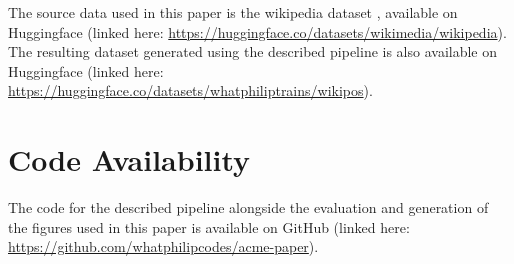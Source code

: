 The source data used in this paper is the wikipedia dataset \cite{WikimediaWikipediaDatasets2025}, available on Huggingface (linked here: \href{https://huggingface.co/datasets/wikimedia/wikipedia}{https://huggingface.co/datasets/wikimedia/wikipedia}). The resulting dataset generated using the described pipeline is also available on Huggingface (linked here: \href{https://huggingface.co/datasets/whatphiliptrains/wikipos}{https://huggingface.co/datasets/whatphiliptrains/wikipos}).

\section{Code Availability}
\label{sec:code-av}

The code for the described pipeline alongside the evaluation and generation of the figures used in this paper is available on GitHub (linked here: \href{https://github.com/whatphilipcodes/acme-paper}{https://github.com/whatphilipcodes/acme-paper}).


%







